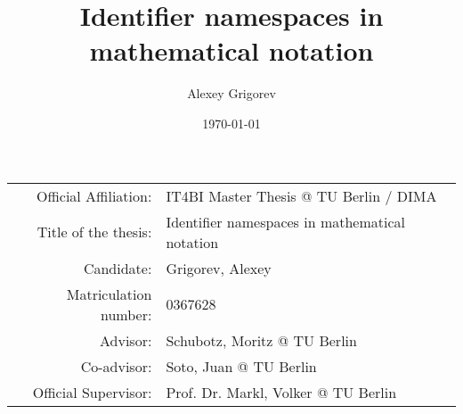 
\title{Identifier namespaces in mathematical notation}
\author{Alexey Grigorev}
\date{\today}
\maketitle


\begin{tabular}{|r|l|}
  \hline
  Official Affiliation: & IT4BI Master Thesis @ TU Berlin / DIMA \\
  Title of the thesis: & Identifier namespaces in mathematical notation \\
  Candidate: & Grigorev, Alexey \\
  Matriculation number: & 0367628 \\
  Advisor:  & Schubotz, Moritz @ TU Berlin \\
  Co-advisor: & Soto, Juan @ TU Berlin \\
  Official Supervisor: &  Prof. Dr. Markl, Volker @ TU Berlin \\
  \hline
\end{tabular} 

\newpage